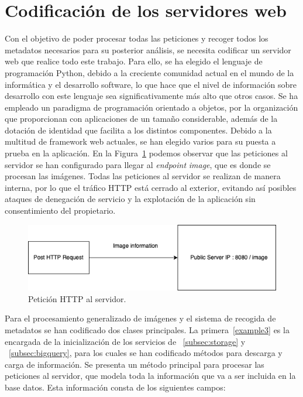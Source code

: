 \section{Codificación de los servidores web}\label{sec:codificación-de-los-servidores-web}
Con el objetivo de poder procesar todas las peticiones y recoger todos los metadatos necesarios para su posterior análisis, se necesita codificar un servidor web que realice todo este trabajo.
Para ello, se ha elegido el lenguaje de programación Python, debido a la creciente comunidad actual en el mundo de la informática y el desarrollo software, lo que hace que el nivel de información sobre desarrollo con este lenguaje sea significativamente más alto que otros casos.
Se ha empleado un paradigma de programación orientado a objetos, por la organización que proporcionan con aplicaciones de un tamaño considerable, además de la dotación de identidad que facilita a los distintos componentes. Debido a la multitud de framework web actuales, se han elegido varios para su puesta a prueba en la aplicación.
En la Figura~\ref{fig:Petición HTTP al servidor} podemos observar que las peticiones al servidor se han configurado para llegar al \textit{endpoint} \textit{image}, que es donde se procesan las imágenes.
Todas las peticiones al servidor se realizan de manera interna, por lo que el tráfico HTTP está cerrado al exterior, evitando así posibles ataques de denegación de servicio y la explotación de la aplicación sin consentimiento del propietario.

\begin{figure}
    \centering
    \includegraphics[width=1.0\textwidth]{images/chapter4/http_request.png}
    \caption{Petición HTTP al servidor.}
    \label{fig:Petición HTTP al servidor}
\end{figure}

Para el procesamiento generalizado de imágenes y el sistema de recogida de metadatos se han codificado dos clases principales.
La primera~\ref{example3} es la encargada de la inicialización de los servicios de ~\ref{subsec:storage} y ~\ref{subsec:bigquery}, para los cuales se han codificado métodos para descarga y carga de información.
Se presenta un método principal para procesar las peticiones al servidor, que modela toda la información que va a ser incluida en la base datos.
Esta información consta de los siguientes campos:


